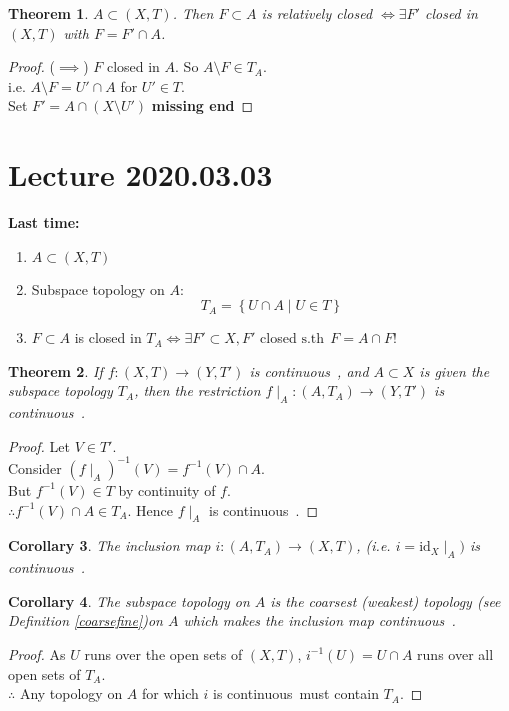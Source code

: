 \documentclass{article}
\newcommand{\sth}{\mathrm{s.th}\ }
\newcommand{\cts}{continuous\ }
\newtheorem{stheorem}{Theorem}[theorem]
\newtheorem{scorollary}[stheorem]{Corollary}
\theoremstyle{remark}
\theoremstyle{example}
\theoremstyle{examples}
\begin{document}
	\begin{stheorem}
		\label{relativelyclosediffsubsetclosed}
		$A \subset (X,T)$. Then $F \subset A$ is relatively closed $\iff \exists F'$ closed in $(X,T)$ with $F=F' \cap A$.
	\end{stheorem}
	\begin{proof}
		($\implies$) $F$ closed in $A$. So $A \setminus F \in T_A$.\\
		i.e. $A \setminus F = U' \cap A$ for $U' \in T$.\\
		Set $F' = A \cap \left(X \setminus U'\right)$
		\textbf{missing end}
	\end{proof}
	
	\section*{Lecture 2020.03.03}
	\textbf{Last time:} \begin{enumerate}
		\item $A \subset(X,T)$
		\item Subspace topology on $A$: \[T_A = \left\{U \cap A \mid U \in T \right\}\]
		\item $F \subset A$ is closed in $T_A \iff \exists F' \subset X, F'$ closed $\sth\ F=A \cap F$!
	\end{enumerate}

	\begin{stheorem}
		If $f:(X,T) \to (Y,T')$ is \cts, and $A \subset X$ is given the subspace topology $T_A$, then the restriction $f \mid_A:(A,T_A) \to (Y,T')$ is \cts.
	\end{stheorem}
	\begin{proof}
		Let $V \in T'$.\\
		Consider $\left(f \mid_A\right)^{-1}\left(V\right) = f^{-1}(V) \cap A$.\\
		But $f^{-1}(V) \in T$ by continuity of $f$.\\
		$\therefore f^{-1}(V) \cap A \in T_A$. Hence $f \mid_A$ is \cts.
	\end{proof}

	\begin{scorollary}
		The inclusion map $i:(A,T_A) \to (X,T)$, (i.e. $i=\mathrm{id}_X \mid_A)$ is \cts.
	\end{scorollary}

	\begin{scorollary}
		The subspace topology on $A$ is the coarsest (weakest) topology (see Definition \ref{coarsefine})on $A$ which makes the inclusion map \cts.
	\end{scorollary}
	\begin{proof}
		As $U$ runs over the open sets of $(X,T)$, $i^{-1}(U)=U\cap A$ runs over all open sets of $T_A$.\\
		$\therefore$ Any topology on $A$ for which $i$ is \cts must contain $T_A$.
	\end{proof}
\end{document}
